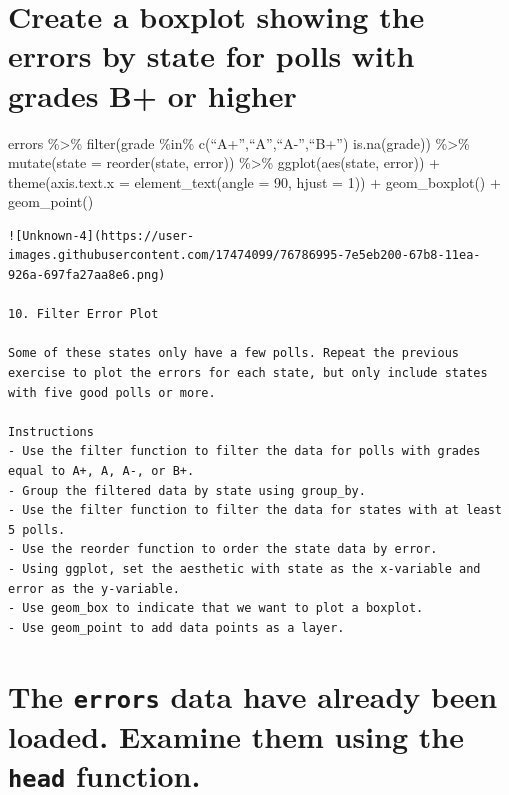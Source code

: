 \documentclass[
]{article}
\begin{document}
\begin{verbatim}
\end{verbatim}

\hypertarget{create-a-boxplot-showing-the-errors-by-state-for-polls-with-grades-b-or-higher}{%
\section{Create a boxplot showing the errors by state for polls with
grades B+ or
higher}\label{create-a-boxplot-showing-the-errors-by-state-for-polls-with-grades-b-or-higher}}

errors \%\textgreater\% filter(grade \%in\%
c(``A+'',``A'',``A-'',``B+'') \textbar{} is.na(grade)) \%\textgreater\%
mutate(state = reorder(state, error)) \%\textgreater\% ggplot(aes(state,
error)) + theme(axis.text.x = element\_text(angle = 90, hjust = 1)) +
geom\_boxplot() + geom\_point()

\begin{verbatim}
![Unknown-4](https://user-images.githubusercontent.com/17474099/76786995-7e5eb200-67b8-11ea-926a-697fa27aa8e6.png)

10. Filter Error Plot

Some of these states only have a few polls. Repeat the previous exercise to plot the errors for each state, but only include states with five good polls or more.

Instructions
- Use the filter function to filter the data for polls with grades equal to A+, A, A-, or B+.
- Group the filtered data by state using group_by.
- Use the filter function to filter the data for states with at least 5 polls.
- Use the reorder function to order the state data by error.
- Using ggplot, set the aesthetic with state as the x-variable and error as the y-variable.
- Use geom_box to indicate that we want to plot a boxplot.
- Use geom_point to add data points as a layer.
\end{verbatim}

\hypertarget{the-errors-data-have-already-been-loaded.-examine-them-using-the-head-function.-2}{%
\section{\texorpdfstring{The \texttt{errors} data have already been
loaded. Examine them using the \texttt{head}
function.}{The errors data have already been loaded. Examine them using the head function.}}\label{the-errors-data-have-already-been-loaded.-examine-them-using-the-head-function.-2}}
\end{document}

